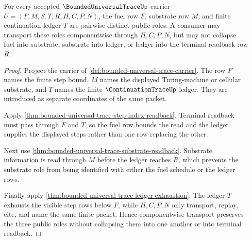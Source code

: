\begin{theorem}
\label{thm:bounded-universal-trace-fuel-substrate-ledger-separation}
For every accepted $\BoundedUniversalTraceUp$ carrier
$U=(F,M,S,T,R,H,C,P,N)$, the fuel row $F$, substrate row $M$, and finite
continuation ledger $T$ are pairwise distinct public roles. A consumer may
transport these roles componentwise through $H,C,P,N$, but may not collapse
fuel into substrate, substrate into ledger, or ledger into the terminal readback
row $R$.
\end{theorem}
\begin{proof}
Project the carrier of \autoref{def:bounded-universal-trace-carrier}. The row
$F$ names the finite step bound, $M$ names the displayed Turing-machine or
cellular substrate, and $T$ names the finite $\ContinuationTraceUp$ ledger.
They are introduced as separate coordinates of the same packet.

Apply \autoref{thm:bounded-universal-trace-step-index-readback}. Terminal
readback must pass through $F$ and $T$, so the fuel row bounds the read and the
ledger supplies the displayed steps rather than one row replacing the other.

Next use \autoref{thm:bounded-universal-trace-substrate-readback}. Substrate
information is read through $M$ before the ledger reaches $R$, which prevents
the substrate role from being identified with either the fuel schedule or the
ledger rows.

Finally apply \autoref{thm:bounded-universal-trace-ledger-exhaustion}. The
ledger $T$ exhausts the visible step rows below $F$, while $H,C,P,N$ only
transport, replay, cite, and name the same finite packet. Hence componentwise
transport preserves the three public roles without collapsing them into one
another or into terminal readback.
\end{proof}

